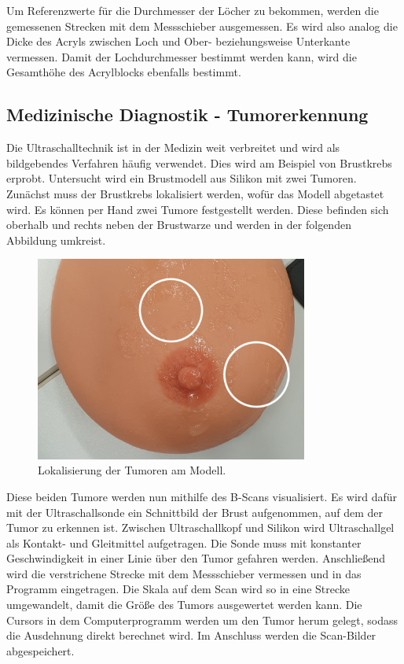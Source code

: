 \noindent Um Referenzwerte für die Durchmesser der Löcher zu bekommen, werden die gemessenen Strecken 
mit dem Messschieber ausgemessen. Es wird also analog die Dicke des Acryls zwischen Loch und Ober- 
beziehungsweise Unterkante vermessen. Damit der Lochdurchmesser bestimmt werden kann, wird die 
Gesamthöhe des Acrylblocks ebenfalls bestimmt. 


\subsection{Medizinische Diagnostik - Tumorerkennung}
Die Ultraschalltechnik ist in der Medizin weit verbreitet und wird als bildgebendes Verfahren häufig 
verwendet. Dies wird am Beispiel von Brustkrebs erprobt. Untersucht wird ein Brustmodell aus Silikon 
mit zwei Tumoren. Zunächst muss der Brustkrebs lokalisiert werden, wofür das Modell abgetastet wird. 
Es können per Hand zwei Tumore festgestellt werden. Diese befinden sich oberhalb und rechts neben 
der Brustwarze und werden in der folgenden Abbildung umkreist. 

\begin{figure}[H]
    \centering
    \includegraphics[width = 0.8\textwidth]{content/Tumororientierung2.jpg}
    \caption{Lokalisierung der Tumoren am Modell.}
    \label{fig:Acrylblock}
\end{figure}
 
\noindent Diese beiden Tumore werden nun mithilfe des B-Scans visualisiert. Es wird dafür mit der 
Ultraschallsonde ein Schnittbild der Brust aufgenommen, auf dem der Tumor zu erkennen ist. Zwischen 
Ultraschallkopf und Silikon wird Ultraschallgel als Kontakt- und Gleitmittel aufgetragen. Die Sonde 
muss mit konstanter Geschwindigkeit in einer Linie über den Tumor gefahren werden. Anschließend wird 
die verstrichene Strecke mit dem Messschieber vermessen und in das Programm eingetragen. Die Skala 
auf dem Scan wird so in eine Strecke umgewandelt, damit die Größe des Tumors ausgewertet werden kann.
Die Cursors in dem Computerprogramm werden um den Tumor herum gelegt, sodass die Ausdehnung direkt 
berechnet wird. Im Anschluss werden die Scan-Bilder abgespeichert. 


